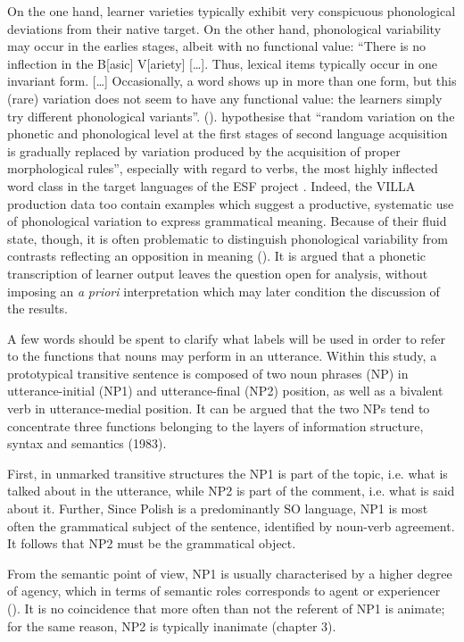 On the one hand, learner varieties typically exhibit very conspicuous phonological deviations from their native target. On the other hand, phonological variability may occur in the earlies stages, albeit with no functional value: “There is no inflection in the B[asic] V[ariety] […]. Thus, lexical items typically occur in one invariant form. […] Occasionally, a word shows up in more than one form, but this (rare) variation does not seem to have any functional value: the learners simply try different phonological variants”. (\citealt[311]{KleinPerdue1997}). \citet[160–161]{BroederEtAl1993} hypothesise that “random variation on the phonetic and phonological level at the first stages of second language acquisition is gradually replaced by variation produced by the acquisition of proper morphological rules”, especially with regard to verbs, the most highly inflected word class in the target languages of the ESF project \citep{Perdue1993}. Indeed, the VILLA production data too contain examples which suggest a productive, systematic use of phonological variation to express grammatical meaning. Because of their fluid state, though, it is often problematic to distinguish phonological variability from contrasts reflecting an opposition in meaning (\citealt{Bernini2018Fonetica, Bernini2018Pattern, Dimroth2018}). It is argued that a phonetic transcription of learner output leaves the question open for analysis, without imposing an \textit{a} \textit{priori} interpretation which may later condition the discussion of the results.

A few words should be spent to clarify what labels will be used in order to refer to the functions that nouns may perform in an utterance. Within this study, a prototypical transitive sentence is composed of two noun phrases (NP) in utterance-initial (NP1) and utterance-final (NP2) position, as well as a bivalent verb in utterance-medial position. It can be argued that the two NPs tend to concentrate three functions belonging to the layers of information structure, syntax and semantics (1983).

First, in unmarked transitive structures the NP1 is part of the topic, i.e. what is talked about in the utterance, while NP2 is part of the comment, i.e. what is said about it. Further, Since Polish is a predominantly SO language, NP1 is most often the grammatical subject of the sentence, identified by noun-verb agreement. It follows that NP2 must be the grammatical object.

From the semantic point of view, NP1 is usually characterised by a higher degree of agency, which in terms of semantic roles corresponds to agent or experiencer (). It is no coincidence that more often than not the referent of NP1 is animate; for the same reason, NP2 is typically inanimate (chapter 3).

